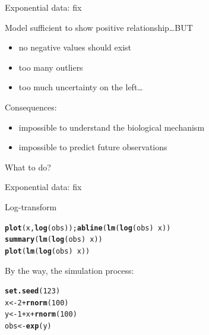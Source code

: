 \documentclass[10pt]{beamer}\usepackage[]{graphicx}\usepackage[]{color}
\makeatletter
\newcommand{\hlnum}[1]{\textcolor[rgb]{0.686,0.059,0.569}{#1}}%
\newcommand{\hlopt}[1]{\textcolor[rgb]{0,0,0}{#1}}%
\newcommand{\hlstd}[1]{\textcolor[rgb]{0.345,0.345,0.345}{#1}}%
\newcommand{\hlkwb}[1]{\textcolor[rgb]{0.69,0.353,0.396}{#1}}%
\newcommand{\hlkwd}[1]{\textcolor[rgb]{0.737,0.353,0.396}{\textbf{#1}}}%
\newenvironment{kframe}{%
 \def\at@end@of@kframe{}%
 \ifinner\ifhmode%
  \def\at@end@of@kframe{\end{minipage}}%
  \begin{minipage}{\columnwidth}%
 \fi\fi%
 \def\FrameCommand##1{\hskip\@totalleftmargin \hskip-\fboxsep
 \colorbox{shadecolor}{##1}\hskip-\fboxsep
     \hskip-\linewidth \hskip-\@totalleftmargin \hskip\columnwidth}%
 \MakeFramed {\advance\hsize-\width
   \@totalleftmargin\z@ \linewidth\hsize
   \@setminipage}}%
 {\par\unskip\endMakeFramed%
 \at@end@of@kframe}
\newenvironment{knitrout}{}{} %
\makeatother
\begin{document}
%
\begin{frame}[fragile]{Exponential data: fix}
\begin{block}{Model sufficient to show positive relationship\dots BUT}
  \begin{itemize}
    \item no negative values should exist
    \item too many outliers
    \item too much uncertainty on the left\dots
  \end{itemize}
\end{block}

\begin{block}{Consequences:}
\begin{itemize}
\item impossible to understand the biological mechanism
\item impossible to predict future observations
\end{itemize}
\end{block}

What to do?
\end{frame}

\begin{frame}[fragile]{Exponential data: fix}

Log-transform
\begin{knitrout}\small
{}\color{fgcolor}\begin{kframe}
\begin{alltt}
\hlkwd{plot}\hlstd{(x,} \hlkwd{log}\hlstd{(obs));} \hlkwd{abline}\hlstd{(}\hlkwd{lm}\hlstd{(}\hlkwd{log}\hlstd{(obs)} \hlopt{~} \hlstd{x))}
\hlkwd{summary}\hlstd{(}\hlkwd{lm}\hlstd{(}\hlkwd{log}\hlstd{(obs)} \hlopt{~} \hlstd{x))}
\hlkwd{plot}\hlstd{(}\hlkwd{lm}\hlstd{(}\hlkwd{log}\hlstd{(obs)} \hlopt{~} \hlstd{x))}
\end{alltt}
\end{kframe}
\end{knitrout}

\pause
By the way, the simulation process:
\begin{knitrout}\small
{}\color{fgcolor}\begin{kframe}
\begin{alltt}
\hlkwd{set.seed}\hlstd{(}\hlnum{123}\hlstd{)}
\hlstd{x} \hlkwb{<-} \hlnum{2}\hlopt{+}\hlkwd{rnorm}\hlstd{(}\hlnum{100}\hlstd{)}
\hlstd{y} \hlkwb{<-} \hlnum{1} \hlopt{+} \hlstd{x} \hlopt{+} \hlkwd{rnorm}\hlstd{(}\hlnum{100}\hlstd{)}
\hlstd{obs} \hlkwb{<-} \hlkwd{exp}\hlstd{(y)}
\end{alltt}
\end{kframe}
\end{knitrout}

\end{frame}
\end{document}
